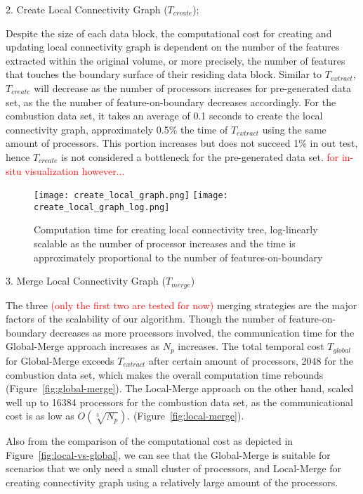 2. Create Local Connectivity Graph ($T_{create}$);

Despite the size of each data block, the computational cost for creating and updating local connectivity graph is dependent on the number of the features extracted within the original volume, or more precisely, the number of features that touches the boundary surface of their residing data block. Similar to $T_{extract}$, $T_{create}$ will decrease as the number of processors increases for pre-generated data set, as the the number of feature-on-boundary decreases accordingly. For the combustion data set, it takes an average of 0.1 seconds to create the local connectivity graph, approximately 0.5\% the time of $T_{extract}$ using the same amount of processors. This portion increases but does not succeed 1\% in out test, hence $T_{create}$ is not considered a bottleneck for the pre-generated data set. \textcolor{red}{for in-situ visualization however... }

\begin{figure}[ht]
	\centering
	\texttt{[image: create\_local\_graph.png]}
	\texttt{[image: create\_local\_graph\_log.png]}
	\caption{Computation time for creating local connectivity tree, log-linearly scalable as the number of processor increases and the time is approximately proportional to the number of features-on-boundary}
	\label{fig:create-local-graph}
\end{figure}

3. Merge Local Connectivity Graph ($T_{merge}$)

The three \textcolor{red}{(only the first two are tested for now)} merging strategies are the major factors of the scalability of our algorithm. Though the number of feature-on-boundary decreases as more processors involved, the communication time for the Global-Merge approach increases as $N_p$ increases. The total temporal cost $T_{global}$ for Global-Merge exceeds $T_{extract}$ after certain amount of processors, 2048 for the combustion data set, which makes the overall computation time rebounds (Figure~\ref{fig:global-merge}). The Local-Merge approach on the other hand, scaled well up to 16384 processors for the combustion data set, as the communicational cost is as low as ${O(\sqrt[3]{N_p})}$. (Figure~\ref{fig:local-merge}).

Also from the comparison of the computational cost as depicted in Figure~\ref{fig:local-vs-global}, we can see that the Global-Merge is suitable for scenarios that we only need a small cluster of processors, and Local-Merge for creating connectivity graph using a relatively large amount of the processors.

